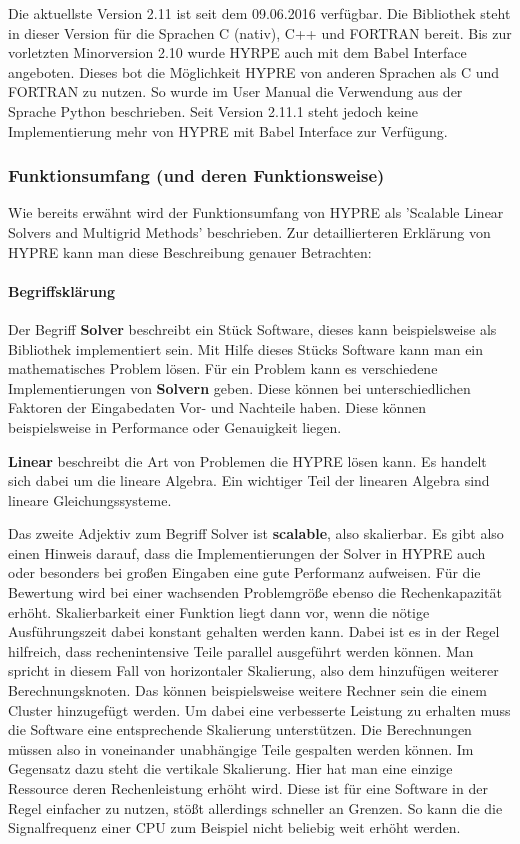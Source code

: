 \documentclass[a4paper,10pt]{article}
\numberwithin{figure}{section}
\numberwithin{table}{section}
\begin{document}
Die aktuellste Version 2.11 ist seit dem 09.06.2016 verfügbar.
Die Bibliothek steht in dieser Version für die Sprachen C (nativ), C++ und FORTRAN bereit.
Bis zur vorletzten Minorversion 2.10 wurde HYRPE auch mit dem Babel Interface angeboten.
Dieses bot die Möglichkeit HYPRE von anderen Sprachen als C und FORTRAN zu nutzen.
So wurde im User Manual die Verwendung aus der Sprache Python beschrieben.
Seit Version 2.11.1 steht jedoch keine Implementierung mehr von HYPRE mit Babel Interface zur Verfügung.

\subsubsection{Funktionsumfang (und deren Funktionsweise)}

Wie bereits erwähnt wird der Funktionsumfang von HYPRE als 'Scalable Linear Solvers and Multigrid Methods' beschrieben.
Zur detaillierteren Erklärung von HYPRE kann man diese Beschreibung genauer Betrachten:

\paragraph{Begriffsklärung}

Der Begriff \textbf{Solver} beschreibt ein Stück Software, dieses kann beispielsweise als Bibliothek implementiert sein.
Mit Hilfe dieses Stücks Software kann man ein mathematisches Problem lösen.
Für ein Problem kann es verschiedene Implementierungen von \textbf{Solvern} geben.
Diese können bei unterschiedlichen Faktoren der Eingabedaten Vor- und Nachteile haben.
Diese können beispielsweise in Performance oder Genauigkeit liegen.

\textbf{Linear} beschreibt die Art von Problemen die HYPRE lösen kann.
Es handelt sich dabei um die lineare Algebra.
Ein wichtiger Teil der linearen Algebra sind lineare Gleichungssysteme.

Das zweite Adjektiv zum Begriff Solver ist \textbf{scalable}, also skalierbar.
Es gibt also einen Hinweis darauf, dass die Implementierungen der Solver in HYPRE auch oder besonders bei großen Eingaben eine gute Performanz aufweisen.
Für die Bewertung wird bei einer wachsenden Problemgröße ebenso die Rechenkapazität erhöht.
Skalierbarkeit einer Funktion liegt dann vor, wenn die nötige Ausführungszeit dabei konstant gehalten werden kann.\cite{Henson00boomeramg}
Dabei ist es in der Regel hilfreich, dass rechenintensive Teile parallel ausgeführt werden können.
Man spricht in diesem Fall von horizontaler Skalierung, also dem hinzufügen weiterer Berechnungsknoten.
Das können beispielsweise weitere Rechner sein die einem Cluster hinzugefügt werden.
Um dabei eine verbesserte Leistung zu erhalten muss die Software eine entsprechende Skalierung unterstützen.
Die Berechnungen müssen also in voneinander unabhängige Teile gespalten werden können.
Im Gegensatz dazu steht die vertikale Skalierung.
Hier hat man eine einzige Ressource deren Rechenleistung erhöht wird.
Diese ist für eine Software in der Regel einfacher zu nutzen, stößt allerdings schneller an Grenzen.
So kann die die Signalfrequenz einer CPU zum Beispiel nicht beliebig weit erhöht werden.
\end{document}
